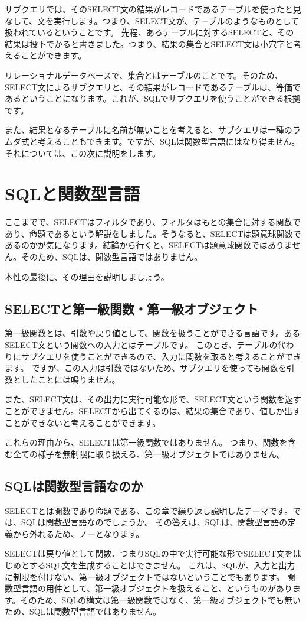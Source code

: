 サブクエリでは、そのSELECT文の結果がレコードであるテーブルを使ったと見なして、文を実行します。つまり、SELECT文が、テーブルのようなものとして扱われているということです。
先程、あるテーブルに対するSELECTと、その結果は投下でかると書きました。つまり、結果の集合とSELECT文は小穴字と考えることができます。

リレーショナルデータベースで、集合とはテーブルのことです。そのため、SELECT文によるサブクエリと、その結果がレコードであるテーブルは、等価であるということになります。これが、SQLでサブクエリを使うことができる根拠です。

また、結果となるテーブルに名前が無いことを考えると、サブクエリは一種のラムダ式と考えることもできます。ですが、SQLは関数型言語にはなり得ません。それについては、この次に説明をします。

\section{SQLと関数型言語}

ここまでで、SELECTはフィルタであり、フィルタはもとの集合に対する関数であり、命題であるという解説をしました。そうなると、SELECTは題意球関数であるのかが気になります。結論から行くと、SELECTは題意球関数ではありません。そのため、SQLは、関数型言語ではありません。

本性の最後に、その理由を説明しましょう。

\subsection{SELECTと第一級関数・第一級オブジェクト}

第一級関数とは、引数や戻り値として、関数を扱うことができる言語です。あるSELECT文という関数への入力とはテーブルです。
このとき、テーブルの代わりにサブクエリを使うことができるので、入力に関数を取ると考えることができます。
ですが、この入力は引数ではないため、サブクエリを使っても関数を引数としたことには鳴りません。

また、SELECT文は、その出力に実行可能な形で、SELECT文という関数を返すことができません。SELECTから出てくるのは、結果の集合であり、値しか出すことができないと考えることができます。

これらの理由から、SELECTは第一級関数ではありません。
つまり、関数を含む全ての様子を無制限に取り扱える、第一級オブジェクトではありません。

\subsection{SQLは関数型言語なのか}

SELECTとは関数であり命題である、この章で繰り返し説明したテーマです。では、SQLは関数型言語なのでしょうか。
その答えは、SQLは、関数型言語の定義から外れるため、ノーとなります。

SELECTは戻り値として関数、つまりSQLの中で実行可能な形でSELECT文をはじめとするSQL文を生成することはできません。
これは、SQLが、入力と出力に制限を付けない、第一級オブジェクトではないということでもあります。
関数型言語の用件として、第一級オブジェクトを扱えること、というものがあります。そのため、SQLの構文は第一級関数ではなく、第一級オブジェクトでも無いため、SQLは関数型言語ではありません。
